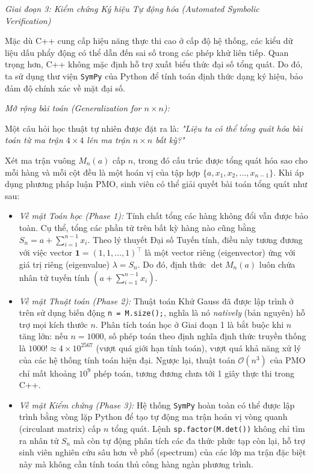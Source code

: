 \documentclass{article}
\begin{document}
\vspace{0.5em}\noindent\emph{Giai đoạn 3: Kiểm chứng Ký hiệu Tự động hóa (Automated Symbolic Verification)}

Mặc dù C++ cung cấp hiệu năng thực thi cao ở cấp độ hệ thống, các kiểu dữ liệu dấu phẩy động có thể dẫn đến sai số trong các phép khử liên tiếp. Quan trọng hơn, C++ không mặc định hỗ trợ xuất biểu thức đại số tổng quát. Do đó, ta sử dụng thư viện \texttt{\textsf{SymPy}} của Python để tính toán định thức dạng ký hiệu, bảo đảm độ chính xác về mặt đại số.


\vspace{0.5em}\noindent\textit{Mở rộng bài toán (Generalization for $n \times n$):}

Một câu hỏi học thuật tự nhiên được đặt ra là: \textit{"Liệu ta có thể tổng quát hóa bài toán từ ma trận $4 \times 4$ lên ma trận $n \times n$ bất kỳ?"}

Xét ma trận vuông $M_n(a)$ cấp $n$, trong đó cấu trúc được tổng quát hóa sao cho mỗi hàng và mỗi cột đều là một hoán vị của tập hợp $\{a, x_1, x_2, \dots, x_{n-1}\}$. Khi áp dụng phương pháp luận PMO, sinh viên có thể giải quyết bài toán tổng quát như sau:

\begin{itemize}
 \item \textit{Về mặt Toán học (Phase 1):} Tính chất tổng các hàng không đổi vẫn được bảo toàn. Cụ thể, tổng các phần tử trên bất kỳ hàng nào cũng bằng $S_n = a + \sum_{i=1}^{n-1} x_i$. Theo lý thuyết Đại số Tuyến tính, điều này tương đương với việc vector $\mathbf{1} = (1, 1, \dots, 1)^\top$ là một vector riêng (eigenvector) ứng với giá trị riêng (eigenvalue) $\lambda = S_n$. Do đó, định thức $\det M_n(a)$ luôn chứa nhân tử tuyến tính $(a + \sum_{i=1}^{n-1} x_i)$.
 \item \textit{Về mặt Thuật toán (Phase 2):} Thuật toán Khử Gauss đã được lập trình ở trên sử dụng biến động \texttt{n = M.size();}, nghĩa là nó \textit{natively} (bản nguyên) hỗ trợ mọi kích thước $n$. Phân tích toán học ở Giai đoạn 1 là bắt buộc khi $n$ tăng lớn: nếu $n = 1000$, số phép toán theo định nghĩa định thức truyền thống là $1000! \approx 4 \times 10^{2567}$ (vượt quá giới hạn tính toán), vượt quá khả năng xử lý của các hệ thống tính toán hiện đại. Ngược lại, thuật toán $\mathcal{O}(n^3)$ của PMO chỉ mất khoảng $10^9$ phép toán, tương đương chưa tới 1 giây thực thi trong C++.
 \item \textit{Về mặt Kiểm chứng (Phase 3):} Hệ thống \texttt{\textsf{SymPy}} hoàn toàn có thể được lập trình bằng vòng lặp Python để tạo tự động ma trận hoán vị vòng quanh (circulant matrix) cấp $n$ tổng quát. Lệnh \texttt{sp.factor(M.det())} không chỉ tìm ra nhân tử $S_n$ mà còn tự động phân tích các đa thức phức tạp còn lại, hỗ trợ sinh viên nghiên cứu sâu hơn về phổ (spectrum) của các lớp ma trận đặc biệt này mà không cần tính toán thủ công hàng ngàn phương trình.
\end{itemize}
\end{document}
